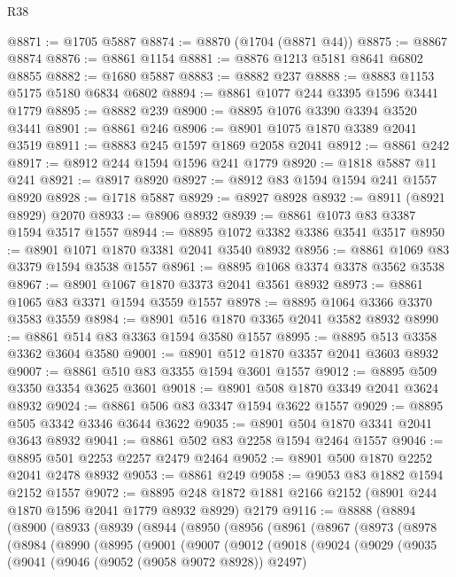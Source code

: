 \begin{lexlean}{R38}
\begin{coremodule}
@8871 := @1705 @5887
@8874 := @8870 (@1704 (@8871 @44))
@8875 := @8867 @8874
@8876 := @8861 @1154
@8881 := @8876 @1213 @5181 @8641 @6802 @8855
@8882 := @1680 @5887
@8883 := @8882 @237
@8888 := @8883 @1153 @5175 @5180 @6834 @6802
@8894 := @8861 @1077 @244 @3395 @1596 @3441 @1779
@8895 := @8882 @239
@8900 := @8895 @1076 @3390 @3394 @3520 @3441
@8901 := @8861 @246
@8906 := @8901 @1075 @1870 @3389 @2041 @3519
@8911 := @8883 @245 @1597 @1869 @2058 @2041
@8912 := @8861 @242
@8917 := @8912 @244 @1594 @1596 @241 @1779
@8920 := @1818 @5887 @11 @241
@8921 := @8917 @8920
@8927 := @8912 @83 @1594 @1594 @241 @1557 @8920
@8928 := @1718 @5887
@8929 := @8927 @8928
@8932 := @8911 (@8921 @8929) @2070
@8933 := @8906 @8932
@8939 := @8861 @1073 @83 @3387 @1594 @3517 @1557
@8944 := @8895 @1072 @3382 @3386 @3541 @3517
@8950 := @8901 @1071 @1870 @3381 @2041 @3540 @8932
@8956 := @8861 @1069 @83 @3379 @1594 @3538 @1557
@8961 := @8895 @1068 @3374 @3378 @3562 @3538
@8967 := @8901 @1067 @1870 @3373 @2041 @3561 @8932
@8973 := @8861 @1065 @83 @3371 @1594 @3559 @1557
@8978 := @8895 @1064 @3366 @3370 @3583 @3559
@8984 := @8901 @516 @1870 @3365 @2041 @3582 @8932
@8990 := @8861 @514 @83 @3363 @1594 @3580 @1557
@8995 := @8895 @513 @3358 @3362 @3604 @3580
@9001 := @8901 @512 @1870 @3357 @2041 @3603 @8932
@9007 := @8861 @510 @83 @3355 @1594 @3601 @1557
@9012 := @8895 @509 @3350 @3354 @3625 @3601
@9018 := @8901 @508 @1870 @3349 @2041 @3624 @8932
@9024 := @8861 @506 @83 @3347 @1594 @3622 @1557
@9029 := @8895 @505 @3342 @3346 @3644 @3622
@9035 := @8901 @504 @1870 @3341 @2041 @3643 @8932
@9041 := @8861 @502 @83 @2258 @1594 @2464 @1557
@9046 := @8895 @501 @2253 @2257 @2479 @2464
@9052 := @8901 @500 @1870 @2252 @2041 @2478 @8932
@9053 := @8861 @249
@9058 := @9053 @83 @1882 @1594 @2152 @1557
@9072 := @8895 @248 @1872 @1881 @2166 @2152 (@8901 @244 @1870 @1596 @2041 @1779 @8932 @8929) @2179
@9116 := @8888
    (@8894
      (@8900
        (@8933
          (@8939
            (@8944
              (@8950
                (@8956
                  (@8961
                    (@8967
                      (@8973
                        (@8978
                          (@8984
                            (@8990
                              (@8995
                                (@9001
                                  (@9007
                                    (@9012
                                      (@9018
                                        (@9024
                                          (@9029
                                            (@9035
                                              (@9041
                                                (@9046 (@9052 (@9058 @9072 @8928)) @2497)

\end{coremodule}
\end{lexlean}
